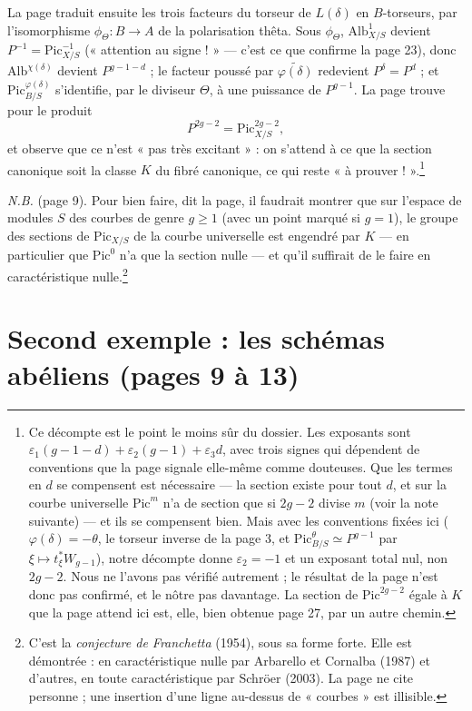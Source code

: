 \documentclass[11pt,a4paper]{article}
\begin{document}
La page traduit ensuite les trois facteurs du torseur de $L(\delta)$ en
$B$-torseurs, par l'isomorphisme $\phi_{\Theta} : B \to A$ de la polarisation
thêta. Sous $\phi_{\Theta}$, $\mathrm{Alb}^{1}_{X/S}$ devient
$P^{-1} = \mathrm{Pic}^{-1}_{X/S}$ (« attention au signe ! » — c'est ce que
confirme la page 23), donc $\mathrm{Alb}^{\chi(\delta)}$ devient
$P^{g-1-d}$ ; le facteur poussé par $\widetilde{\varphi(\delta)}$ redevient
$P^{\delta} = P^{d}$ ; et $\mathrm{Pic}^{\varphi(\delta)}_{B/S}$ s'identifie,
par le diviseur $\Theta$, à une puissance de $P^{g-1}$. La page trouve pour le
produit
\[
P^{2g-2} = \mathrm{Pic}^{2g-2}_{X/S},
\]
et observe que ce n'est « pas très excitant » : on s'attend à ce que la section
canonique soit la classe $K$ du fibré canonique, ce qui reste « à
prouver ! ».\footnote{Ce décompte est le point le moins sûr du dossier. Les
exposants sont $\varepsilon_1(g - 1 - d) + \varepsilon_2(g-1) +
\varepsilon_3 d$, avec trois signes qui dépendent de conventions que la page
signale elle-même comme douteuses. Que les termes en $d$ se compensent est
nécessaire — la section existe pour tout $d$, et sur la courbe universelle
$\mathrm{Pic}^{m}$ n'a de section que si $2g - 2$ divise $m$ (voir la note
suivante) — et ils se compensent bien. Mais avec les conventions fixées ici
($\varphi(\delta) = -\theta$, le torseur inverse de la page 3, et
$\mathrm{Pic}^{\theta}_{B/S} \simeq P^{g-1}$ par $\xi \mapsto
t_{\xi}^{*}W_{g-1}$), notre décompte donne $\varepsilon_2 = -1$ et un
exposant total nul, non $2g - 2$. Nous ne l'avons pas vérifié autrement ; le
résultat de la page n'est donc pas confirmé, et le nôtre pas davantage. La
section de $\mathrm{Pic}^{2g-2}$ égale à $K$ que la page attend ici est, elle,
bien obtenue page 27, par un autre chemin.}

\emph{N.B.} (page 9). Pour bien faire, dit la page, il faudrait montrer que
sur l'espace de modules $S$ des courbes de genre $g \geq 1$ (avec un point
marqué si $g = 1$), le groupe des sections de $\mathrm{Pic}_{X/S}$ de la
courbe universelle est engendré par $K$ — en particulier que $\mathrm{Pic}^{0}$
n'a que la section nulle — et qu'il suffirait de le faire en caractéristique
nulle.\footnote{C'est la \emph{conjecture de Franchetta} (1954), sous sa forme
forte. Elle est démontrée : en caractéristique nulle par Arbarello et Cornalba
(1987) et d'autres, en toute caractéristique par Schröer (2003). La page ne
cite personne ; une insertion d'une ligne au-dessus de « courbes » est
illisible.}

\section*{Second exemple : les schémas abéliens (pages 9 à 13)}
\end{document}
